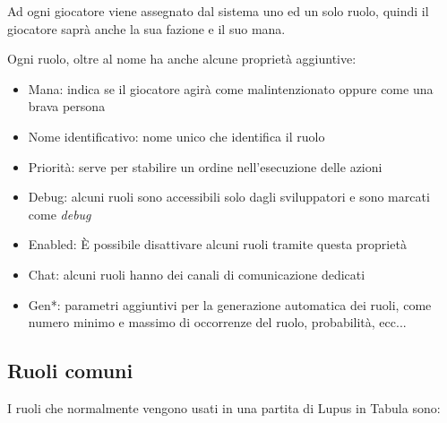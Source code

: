 Ad ogni giocatore viene assegnato dal sistema uno ed un solo ruolo, quindi il giocatore saprà anche la sua fazione e il suo mana. 

Ogni ruolo, oltre al nome ha anche alcune proprietà aggiuntive:

\begin{itemize}
	\item Mana: indica se il giocatore agirà come malintenzionato oppure come una brava persona
	\item Nome identificativo: nome unico che identifica il ruolo
	\item Priorità: serve per stabilire un ordine nell'esecuzione delle azioni
	\item Debug: alcuni ruoli sono accessibili solo dagli sviluppatori e sono marcati come \emph{debug}
	\item Enabled: È possibile disattivare alcuni ruoli tramite questa proprietà
	\item Chat: alcuni ruoli hanno dei canali di comunicazione dedicati
	\item Gen*: parametri aggiuntivi per la generazione automatica dei ruoli, come numero minimo e massimo di occorrenze del ruolo, probabilità, ecc...
\end{itemize}

\subsection{Ruoli comuni}

I ruoli che normalmente vengono usati in una partita di Lupus in Tabula sono:





